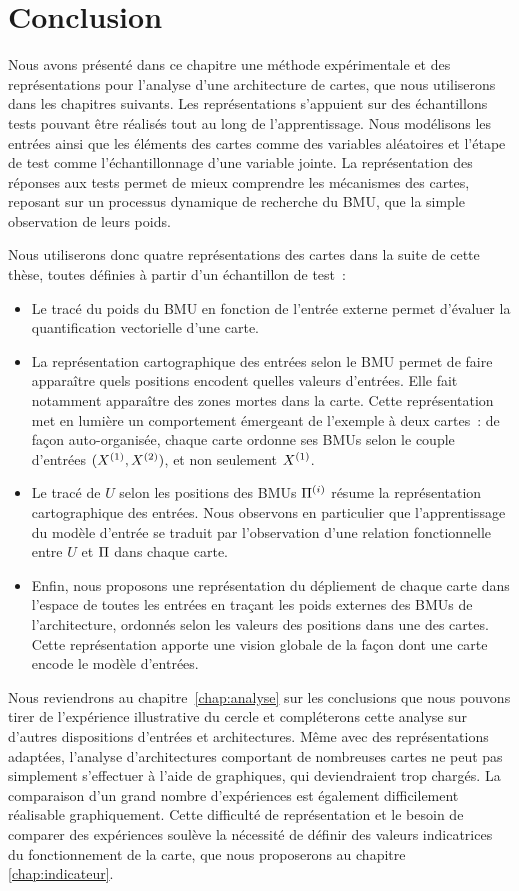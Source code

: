 \documentclass[../main]{subfiles}
\begin{document}
\section{Conclusion}

Nous avons présenté dans ce chapitre une méthode expérimentale et des représentations pour l'analyse d'une architecture de cartes, que nous utiliserons dans les chapitres suivants.
Les représentations s'appuient sur des échantillons tests pouvant être réalisés tout au long de l'apprentissage.
Nous modélisons les entrées ainsi que les éléments des cartes comme des variables aléatoires et l'étape de test comme l'échantillonnage d'une variable jointe. 
La représentation des réponses aux tests permet de mieux comprendre les mécanismes des cartes, reposant sur un processus dynamique de recherche du BMU, que la simple observation de leurs poids.

Nous utiliserons donc quatre représentations des cartes dans la suite de cette thèse, toutes définies à partir d'un échantillon de test~:
\begin{itemize}
    \item Le tracé du poids du BMU en fonction de l'entrée externe permet d'évaluer la quantification vectorielle d'une carte.
    \item La représentation cartographique des entrées selon le BMU permet de faire apparaître quels positions encodent quelles valeurs d'entrées. Elle fait notamment apparaître des zones mortes dans la carte. Cette représentation met en lumière un comportement émergeant de l'exemple à deux cartes~: de façon auto-organisée, chaque carte ordonne ses BMUs selon le couple d'entrées $(X^{({1})},X^{({2})})$, et non seulement $X^{({1})}$.
    \item Le tracé de $U$ selon les positions des BMUs $\Pi^{({i})}$ résume la représentation cartographique des entrées. Nous observons en particulier que l'apprentissage du modèle d'entrée se traduit par l'observation d'une relation fonctionnelle entre $U$ et $\Pi$ dans chaque carte.
    \item Enfin, nous proposons une représentation du dépliement de chaque carte dans l'espace de toutes les entrées en traçant les poids externes des BMUs de l'architecture, ordonnés selon les valeurs des positions dans une des cartes. Cette représentation apporte une vision globale de la façon dont une carte encode le modèle d'entrées.
\end{itemize}

Nous reviendrons au chapitre~\ref{chap:analyse} sur les conclusions que nous pouvons tirer de l'expérience illustrative du cercle et compléterons cette analyse sur d'autres dispositions d'entrées et architectures.
Même avec des représentations adaptées, l'analyse d'architectures comportant de nombreuses cartes ne peut pas simplement s'effectuer à l'aide de graphiques, qui deviendraient trop chargés. 
La comparaison d'un grand nombre d'expériences est également difficilement réalisable graphiquement.
Cette difficulté de représentation et le besoin de comparer des expériences soulève la nécessité de définir des valeurs indicatrices du fonctionnement de la carte, que nous proposerons au chapitre \ref{chap:indicateur}.
 
\ifSubfilesClassLoaded{
    \printbibliography
}{}
\end{document}
